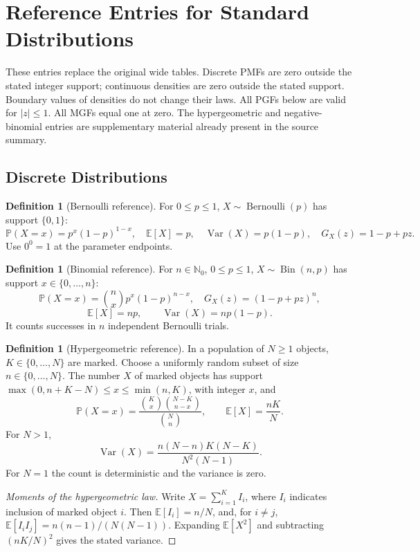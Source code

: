 \documentclass[11pt]{article}
\numberwithin{equation}{section}
\theoremstyle{definition}
\newtheorem{definition}[theorem]{Definition}
\theoremstyle{remark}
\newcommand{\NN}{\mathbb N}
\newcommand{\Prob}{\mathbb P}
\newcommand{\Expt}{\mathbb E}
\DeclareMathOperator{\Var}{Var}
\newcommand{\Bernoulli}{\operatorname{Bernoulli}}
\newcommand{\Binomial}{\operatorname{Bin}}
\begin{document}
\appendix
\section{Reference Entries for Standard Distributions}\label{probability-section-16}
These entries replace the original wide tables. Discrete PMFs are zero outside
the stated integer support; continuous densities are zero outside the stated
support. Boundary values of densities do not change their laws.
All PGFs below are valid for \(|z|\le1\). All MGFs equal one at zero.
The hypergeometric and negative-binomial entries are supplementary material
already present in the source summary.

\subsection{Discrete Distributions}\label{probability-tab:summary-discrete-distribution}
\begin{definition}[Bernoulli reference]\label{probability-definition-071}
For \(0\le p\le1\), \(X\sim\Bernoulli(p)\) has support \(\{0,1\}\):
\[\Prob(X=x)=p^x(1-p)^{1-x},\quad
\Expt[X]=p,\quad \Var(X)=p(1-p),\quad G_X(z)=1-p+pz.\]
Use \(0^0=1\) at the parameter endpoints.
\end{definition}

\begin{definition}[Binomial reference]\label{probability-definition-072}
For \(n\in\NN_0\), \(0\le p\le1\), \(X\sim\Binomial(n,p)\) has support
\(x\in\{0,\ldots,n\}\):
\[\Prob(X=x)=\binom nx p^x(1-p)^{n-x},\quad G_X(z)=(1-p+pz)^n,\]
\[\Expt[X]=np,\qquad\Var(X)=np(1-p).\]
It counts successes in \(n\) independent Bernoulli trials.
\end{definition}

\begin{definition}[Hypergeometric reference]\label{probability-definition-073}
In a population of \(N\ge1\) objects, \(K\in\{0,\ldots,N\}\) are marked.
Choose a uniformly random subset of size \(n\in\{0,\ldots,N\}\).
The number \(X\) of marked objects has support
\(\max(0,n+K-N)\le x\le\min(n,K)\), with integer \(x\), and
\[\Prob(X=x)=\frac{\binom Kx\binom{N-K}{n-x}}{\binom Nn},\qquad
\Expt[X]=\frac{nK}{N}.\]
For \(N>1\),
\[\Var(X)=\frac{n(N-n)K(N-K)}{N^2(N-1)}.\]
For \(N=1\) the count is deterministic and the variance is zero.
\end{definition}
\begin{proof}[Moments of the hypergeometric law]\label{probability-proof-094}
Write \(X=\sum_{i=1}^K I_i\), where \(I_i\) indicates inclusion of marked
object \(i\). Then \(\Expt[I_i]=n/N\), and, for \(i\ne j\),
\(\Expt[I_iI_j]=n(n-1)/(N(N-1))\). Expanding \(\Expt[X^2]\) and
subtracting \((nK/N)^2\) gives the stated variance.
\end{proof}
\end{document}

